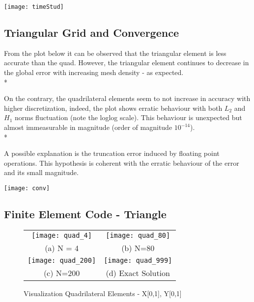 \documentclass[unicode,11pt,a4paper,twoside,numbers=endperiod,openany]{article}
\begin{document}
\begin{center}
   \texttt{[image: timeStud]}
\end{center}
\newpage









\subsection{Triangular Grid and Convergence}
From the plot below it can be observed that the triangular element is less accurate than the quad. However, the triangular element continues to decrease in the global error with increasing mesh density - as expected. 
\\*

On the contrary, the quadrilateral elements seem to not increase in accuracy with higher discretization, indeed, the plot shows  erratic behaviour with both $L_2$ and $H_1$ norms fluctuation (note the loglog scale). This behaviour is unexpected but almost immeasurable  in magnitude (order of magnitude $10^{-14}$).
\\*

A possible explanation is the truncation error induced by floating point operations. This hypothesis is coherent with the erratic behaviour of the error and its small magnitude.

\begin{center}
   \texttt{[image: conv]}
\end{center}
\newpage

\subsection{Finite Element Code -  Triangle}



\newpage











\begin{figure}
\caption{Visualization Quadrilateral Elements - X[0,1], Y[0,1]}
\begin{tabular}{cc}
  \texttt{[image: quad\_4]} &   \texttt{[image: quad\_80]} \\
(a) N = 4 & (b) N=80 \\[6pt]
 \texttt{[image: quad\_200]} &   \texttt{[image: quad\_999]} \\
(c) N=200 & (d) Exact Solution \\[6pt]
\end{tabular}
\end{figure}
\end{document}
